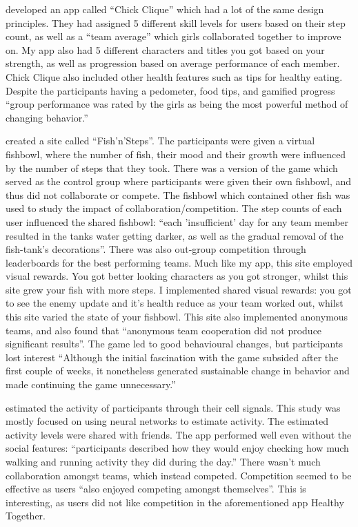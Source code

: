 \documentclass{l4proj}
\begin{document}
\citet{ChickClique} developed an app called ``Chick Clique'' which had a lot of the same design principles. They had assigned 5 different skill levels for users based on their step count, as well as a ``team average'' which girls collaborated together to improve on. My app also had 5 different characters and titles you got based on your strength, as well as progression based on average performance of each member. Chick Clique also included other health features such as tips for healthy eating. Despite the participants having a pedometer, food tips, and gamified progress ``group performance was rated by the girls as being the most powerful method of changing behavior.'' 

\citet{Fish'n'Steps} created a site called ``Fish'n'Steps''. The participants were given a virtual fishbowl, where the number of fish, their mood and their growth were influenced by the number of steps that they took. There was a version of the game which served as the control group where participants were given their own fishbowl, and thus did not collaborate or compete. The fishbowl which contained other fish was used to study the impact of collaboration/competition. The step counts of each user influenced the shared fishbowl: ``each 'insufficient' day for any team member resulted in the tanks water getting darker, as well as the gradual removal of the fish-tank’s decorations''. There was also out-group competition through leaderboards for the best performing teams. Much like my app, this site employed visual rewards. You got better looking characters as you got stronger, whilst this site grew your fish with more steps. I implemented shared visual rewards: you got to see the enemy update and it's health reduce as your team worked out, whilst this site varied the state of your fishbowl. This site also implemented anonymous teams, and also found that ``anonymous team cooperation did not produce significant results''.  The game led to good behavioural changes, but participants lost interest ``Although the initial fascination with the game subsided after the first couple of weeks, it nonetheless generated sustainable change in behavior and made continuing the game unnecessary.''

\citet{Shakra} estimated the activity of participants through their cell signals. This study was mostly focused on using neural networks to estimate activity. The estimated activity levels were shared with friends. The app performed well even without the social features: ``participants described how they would enjoy checking how much walking and running activity they did during the day.'' There wasn't much collaboration amongst teams, which instead competed. Competition seemed to be effective as users ``also enjoyed competing amongst themselves''. This is interesting, as users did not like competition in the aforementioned app Healthy Together. 
\end{document}
